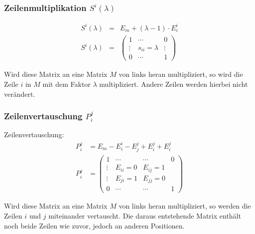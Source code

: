 \subsubsection{Zeilenmultiplikation $S^i(\lambda)$}
\begin{Def}
\begin{align*}
	S^i(\lambda) &=& E_m + (\lambda - 1) \cdot E^i_i \\
	S^i(\lambda) &=& 
	\begin{pmatrix}
	1 & \cdots & 0 \\ 
	\vdots & s_{ii} = \lambda & \vdots \\ 
	0 & \cdots & 1
	\end{pmatrix} 
\end{align*}
\end{Def}
\raggedright 
Wird diese Matrix an eine Matrix $M$ von links heran multipliziert, so wird die Zeile $i$ in $M$ mit dem Faktor $\lambda$ multipliziert. Andere Zeilen werden hierbei nicht verändert.

\subsubsection{Zeilenvertauschung $P^j_i$}
\begin{Def} Zeilenvertauschung:
\begin{align*}
	P^j_i &= E_m - E^i_i - E^j_j + E^j_i + E^j_i \\
	P^j_i &= 
	\begin{pmatrix}
	1 & \cdots & \cdots & 0 \\ 
	\vdots & E_{ii} = 0 & E_{ij} = 1 &  \\ 
	\vdots & E_{ji} = 1 & E_{jj} = 0 &  \\ 
	0 & \cdots & \cdots & 1
	\end{pmatrix} 
\end{align*}
\end{Def}
\raggedright 
Wird diese Matrix an eine Matrix $M$ von links heran multipliziert, so werden die Zeilen $i$ und $j$ miteinander vertauscht. Die daraus entstehende Matrix enthält noch beide Zeilen wie zuvor, jedoch an anderen Positionen.